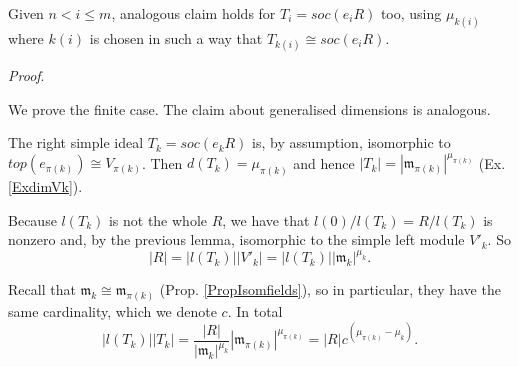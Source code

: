 \documentclass[11pt]{article}
\theoremstyle{plain}
\theoremstyle{remark}
\theoremstyle{plain}
\newenvironment{Proof}{
  \par\medskip\noindent
  \textit{Proof}.
}{
\newline
\rightline{$\qedsymbol$}
}
\newcommand{\m}{\mathfrak{m}}
\begin{document}
 Given $n<i\leq m$, analogous claim holds for $T_i=soc(e_iR)$ too, using $\mu_{k(i)}$ where $k(i)$ is chosen in such a way that $T_{k(i)}\cong soc(e_iR)$.
\begin{Proof}
We prove the finite case. The claim about generalised dimensions is analogous. 

The right simple ideal $T_k=soc(e_kR)$ is, by assumption, isomorphic to $top(e_{\pi(k)})\cong V_{\pi(k)}$. Then $d(T_k)=\mu_{\pi(k)}$  and hence $|T_k|=|\m_{\pi(k)}|^{\mu_{\pi(k)}}$ (Ex. \ref{ExdimVk}).

Because $l(T_k)$ is not the whole $R$, we have that $l(0)/l(T_k)=R/l(T_k)$ is nonzero and, by the previous lemma, isomorphic to the simple left module $V'_k$. So \[|R|=|l(T_k)||V'_k|=|l(T_k)||\m_k|^{\mu_k}.\]



    Recall that $\m_k\cong \m_{\pi(k)}$ (Prop. \ref{PropIsomfields}), so in particular, they have the same cardinality, which we denote $c$. In total \[|l(T_k)||T_k|=\frac{|R|}{|\m_k|^{\mu_k}} |\m_{\pi(k)}|^{\mu_{\pi(k)}}=|R|c^{(\mu_{\pi(k)}-\mu_k)}. \]
\end{Proof}
\end{document}
